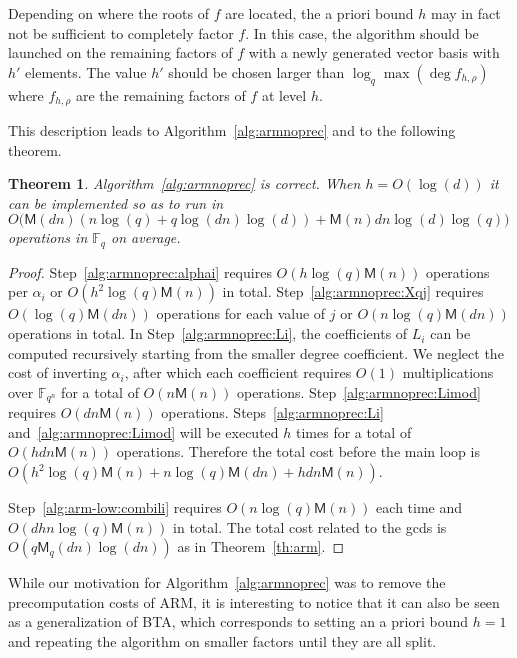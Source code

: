 \documentclass{article}
\newcommand{\ff}[1]{\mathbb{F}_{#1}}
\newcommand{\fqn}{\ff{q^n}}
\newcommand{\qq}{q}
\newcommand{\basef}{\ff{\qq}}
\newcommand{\bigO}{O}
\newcommand{\Mul}{\mathsf{M}}
\newcounter{algo}
\newtheorem{Theo}{Theorem}
\begin{document}
 Depending on where the roots of $f$ are located, the a priori bound $h$ may in fact not be sufficient to completely factor $f$. In this case, the algorithm should be launched on the remaining factors of $f$ with a newly generated vector basis with $h'$ elements. The value $h'$ should be chosen larger than $\log_{\qq} \max(\deg f_{h,\rho})$ where $f_{h,\rho}$ are the remaining factors of $f$ at level $h$.

This description leads to Algorithm~\ref{alg:armnoprec} and to the following theorem.

\begin{Theo}
  \label{th:armnoprec}
  Algorithm~\ref{alg:armnoprec} is correct. When $h=O(\log(d))$ it can be implemented so as to
  run in 
  $O\bigl(\Mul(dn)(n\log(q) + q\log(dn)\log(d))  + \Mul(n)dn\log(d)\log(q)  \bigr)$ 
  operations in $\basef$ on
  average.
\end{Theo}
\begin{proof}
Step~\ref{alg:armnoprec:alphai} requires $\bigO(h\log(q) \Mul(n))$ operations per $\alpha_i$ or $\bigO(h^2\log(q) \Mul(n))$ in total.
Step~\ref{alg:armnoprec:Xqj} requires $\bigO(\log(q)\Mul(dn))$ operations for each value of $j$ or $\bigO(n\log(q)\Mul(dn))$ operations in total.
In Step~\ref{alg:armnoprec:Li}, the coefficients of $L_i$ can be computed recursively starting from the smaller degree coefficient. We neglect the cost of inverting $\alpha_i$, after which each coefficient requires $\bigO(1)$ multiplications over $\fqn$ for a total of $\bigO(n\Mul(n))$ operations.
Step~\ref{alg:armnoprec:Limod} requires $\bigO(dn\Mul(n))$ operations. Steps~\ref{alg:armnoprec:Li} and~\ref{alg:armnoprec:Limod} will be executed $h$ times for a total of $\bigO(hdn\Mul(n))$ operations.
Therefore the total cost before the main loop is $\bigO(h^2\log(q)\Mul(n)+n\log(q)\Mul(dn)+hdn\Mul(n))$.

 
Step~\ref{alg:arm-low:combili} requires $\bigO(n\log(q)\Mul(n))$ each time and $\bigO(dhn\log(q)\Mul(n))$ in total. The total cost related to the gcds is $O(q\Mul_q(dn)\log(dn))$ as in Theorem~\ref{th:arm}.
\end{proof}



While our motivation for Algorithm~\ref{alg:armnoprec} was to remove the precomputation costs of ARM, it is interesting to notice that it can also be seen as a generalization of BTA, which corresponds to setting an a priori bound $h=1$ and repeating the algorithm on smaller factors until they are all split.
\end{document}
